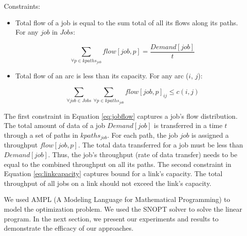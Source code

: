 Constraints:
\begin{itemize}

\item Total flow of a job is equal to the sum total of all its flows along its paths. For any $job$ in $Jobs$: 

\begin{equation} 
\label{eq:jobflow}
\sum_{\forall p \in kpaths_{job}} flow[job, p]  = \frac{Demand[job]}{t}
\end{equation}

\item Total flow of an arc is less than its capacity. For any arc ($i$, $j$):

\begin{equation} 
\label{eq:linkcapacity}
\sum_{\forall job \in Jobs}\sum_{\forall p \in kpaths_{job}} flow[job, p]_{ij} \leq c(i, j)
\end{equation}

\end{itemize}

%

The first constraint in Equation \ref{eq:jobflow} captures a job's flow distribution. The total amount of data of a job $Demand[job]$ is transferred in a time $t$ through a set of paths in $kpaths_{job}$. For each path, the job $job$ is assigned a throughput $flow[job, p]$. The total data transferred for a job must be less than $Demand[job]$. Thus, the job's throughput (rate of data transfer) needs to be equal to the combined throughput on all its paths. The second constraint in Equation \ref{eq:linkcapacity} captures bound for a link's capacity. The total throughput of all jobs on a link should not exceed the link's capacity.

We used AMPL (A Modeling Language for Mathematical Programming) \cite{ampl-book} to model the optimization problem. We used the SNOPT solver to solve the linear program. In the next section, we present our experiments and results to demonstrate the efficacy of our approaches.

